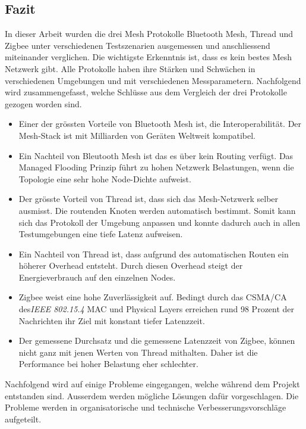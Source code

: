 \newpage
\subsection{Fazit}\label{subsec:Fazit}
In dieser Arbeit wurden die drei Mesh Protokolle Bluetooth Mesh, Thread und Zigbee unter verschiedenen Testszenarien ausgemessen und anschliessend miteinander verglichen.
Die wichtigste Erkenntnis ist, dass es kein bestes Mesh Netzwerk gibt.
Alle Protokolle haben ihre Stärken und Schwächen in verschiedenen Umgebungen und mit verschiedenen Messparametern.
Nachfolgend wird zusammengefasst, welche Schlüsse aus dem Vergleich der drei Protokolle gezogen worden sind.

\begin{itemize}

	\item Einer der grössten Vorteile von Bluetooth Mesh ist, die Interoperabilität. Der Mesh-Stack ist mit Milliarden von Geräten Weltweit kompatibel. 
	\item Ein Nachteil von Bleutooth Mesh ist das es über kein Routing verfügt. Das Managed Flooding Prinzip führt zu hohen Netzwerk Belastungen, wenn die Topologie eine sehr hohe Node-Dichte aufweist.
	\item Der grösste Vorteil von Thread ist, dass sich das Mesh-Netzwerk selber ausmisst. Die routenden Knoten werden automatisch bestimmt. Somit kann sich das Protokoll der Umgebung anpassen und konnte dadurch auch in allen Testumgebungen eine tiefe Latenz aufweisen.
	\item Ein Nachteil von Thread ist, dass aufgrund des automatischen Routen ein höherer Overhead entsteht. Durch diesen Overhead steigt der Energieverbrauch auf den einzelnen Nodes.
	\item Zigbee weist eine hohe Zuverlässigkeit auf.
	Bedingt durch das CSMA\slash CA des\linebreak \textit{IEEE 802.15.4} MAC und Physical Layers erreichen rund 98 Prozent der Nachrichten ihr Ziel mit konstant tiefer Latenzzeit.
	\item Der gemessene Durchsatz und die gemessene Latenzzeit von Zigbee, können nicht ganz mit jenen Werten von Thread mithalten.
	Daher ist die Performance bei hoher Belastung eher schlechter.
\end{itemize}

Nachfolgend wird auf einige Probleme eingegangen, welche während dem Projekt entstanden sind. Ausserdem werden mögliche Lösungen dafür vorgeschlagen.
Die Probleme werden in organisatorische und technische Verbesserungsvorschläge aufgeteilt.

